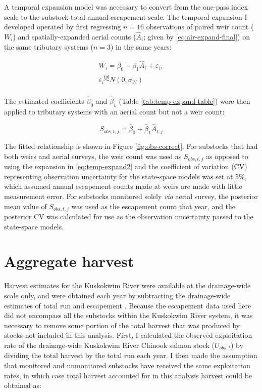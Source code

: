 \documentclass[12pt,]{book}
\theoremstyle{definition}
\theoremstyle{definition}
\theoremstyle{definition}
\theoremstyle{remark}
\begin{document}
\noindent
A temporal expansion model was necessary to convert from the one-pass
index scale to the substock total annual escapement scale. The temporal
expansion I developed operated by first regressing \(n = 16\)
observations of paired weir count (\(W_i\)) and spatially-expanded
aerial counts (\(\hat{A}_{i}\); given by \eqref{eq:air-expand-final}) on
the same tributary systems (\(n = 3\)) in the same years:

\begin{equation}
  \begin{split}
    W_i = \beta_0 + \beta_1 \hat{A}_i + \varepsilon_i, \\
    \varepsilon_i \stackrel{\text{iid}}{\sim} N(0, \sigma_W) \\
  \end{split}
\label{eq:temp-expand1}
\end{equation}

The estimated coefficients \(\hat{\beta}_0\) and \(\hat{\beta}_1\)
(Table \ref{tab:temp-expand-table}) were then applied to tributary
systems with an aerial count but not a weir count:

\begin{equation}
  S_{obs,t,j}=\hat{\beta}_0 + \hat{\beta}_1 \hat{A}_{t,j}
\label{eq:temp-expand2}
\end{equation}

\noindent
The fitted relationship is shown in Figure \ref{fig:obs-correct}. For
substocks that had both weirs and aerial surveys, the weir count was
used as \(S_{obs,t,j}\) as opposed to using the expansion in
\eqref{eq:temp-expand2} and the coefficient of variation (CV) representing
observation uncertainty for the state-space models was set at 5\%, which
assumed annual escapement counts made at weirs are made with little
measurement error. For substocks monitored solely \emph{via} aerial
survey, the posterior mean value of \(S_{obs,t,j}\) was used as the
escapement count that year, and the posterior CV was calculated for use
as the observation uncertainty passed to the state-space models.

\section{Aggregate harvest}\label{harv-expansion}

\noindent
Harvest estimates for the Kuskokwim River were available at the
drainage-wide scale only, and were obtained each year by subtracting the
drainage-wide estimates of total run and escapement
\citep{liller-etal-2018}. Because the escapement data used here did not
encompass all the substocks within the Kuskokwim River system, it was
necessary to remove some portion of the total harvest that was produced
by stocks not included in this analysis. First, I calculated the
observed exploitation rate of the drainage-wide Kuskokwim River Chinook
salmon stock (\(U_{obs,t}\)) by dividing the total harvest by the total
run each year. I then made the assumption that monitored and unmonitored
substocks have received the same exploitation rates, in which case total
harvest accounted for in this analysis harvest could be obtained as:
\end{document}
